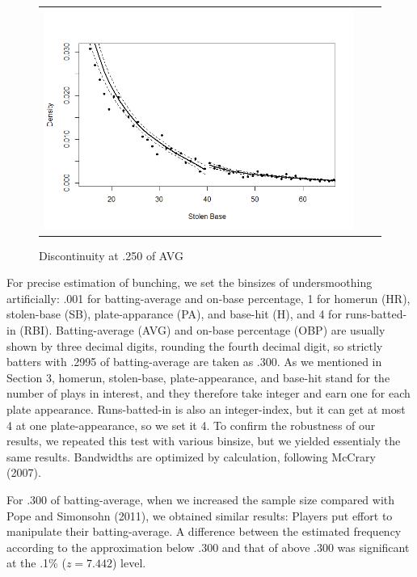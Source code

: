 \documentclass[dvipdfmx, 12pt]{article}
\begin{document}
\begin{figure}
\begin{tabular}{ccc}
{\begin{minipage}{.4\textwidth}
      \includegraphics[keepaspectratio, scale = 0.5, angle = 0]{graphs/SB_40.png}
      \caption{Discontinuity at .250 of AVG}
      \label{DCdensity_SB_40}
    \end{minipage}
    }
  \end{tabular}
\end{figure}

For precise estimation of bunching, we set the binsizes of undersmoothing artificially: .001 for batting-average and on-base percentage, 1 for homerun (HR), stolen-base (SB), plate-apparance (PA), and base-hit (H), and 4 for runs-batted-in (RBI). Batting-average (AVG) and on-base percentage (OBP) are usually shown by three decimal digits, rounding the fourth decimal digit, so strictly batters with .2995 of batting-average are taken as .300. As we mentioned in Section 3, homerun, stolen-base, plate-appearance, and base-hit stand for the number of plays in interest, and they therefore take integer and earn one for each plate appearance. Runs-batted-in is also an integer-index, but it can get at most 4 at one plate-appearance, so we set it 4. To confirm the robustness of our results, we repeated this test with various binsize, but we yielded essentialy the same results. Bandwidths are optimized by calculation, following McCrary (2007).

For .300 of batting-average, when we increased the sample size compared with Pope and Simonsohn (2011), we obtained similar results: Players put effort to manipulate their batting-average. A difference between the estimated frequency according to the approximation below .300 and that of above .300 was significant at the .1\% ($z=7.442$) level.
\end{document}
